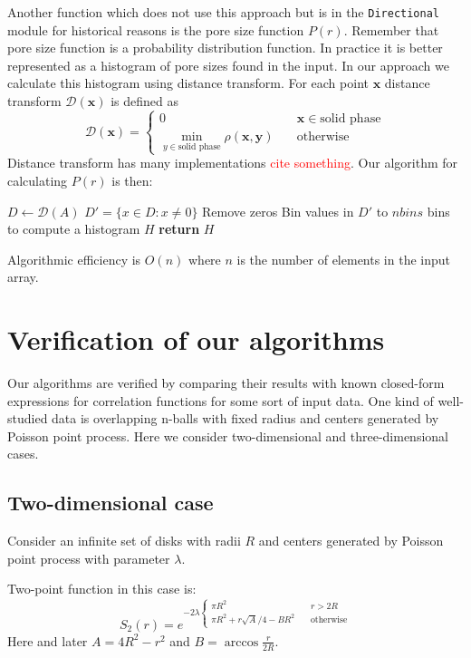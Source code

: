 \documentclass[reprint,amsmath,amssymb,aps,pre,showkeys,showpacs,nofootinbib]{revtex4-1}
\newcommand{\code}[1]{\colorbox{light-gray}{\texttt{#1}}}
\begin{document}
Another function which does not use this approach but is in the
\code{Directional} module for historical reasons is the pore size function
$P(r)$. Remember that pore size function is a probability distribution
function. In practice it is better represented as a histogram of pore sizes
found in the input. In our approach we calculate this histogram using distance
transform. For each point $\bm{x}$ distance transform $\mathcal{D}(\bm{x})$ is
defined as
\begin{equation*}
  \mathcal{D}(\bm{x})= \left\{
  \begin{array}{ll}
    0 & \quad \bm{x} \in \text{solid phase} \\
    \min\limits_{y \in \text{solid phase}} \rho(\bm{x},\bm{y}) & \quad \text{otherwise}
  \end{array}
\right.
\end{equation*}
Distance transform has many implementations \textcolor{red}{cite something}. Our
algorithm for calculating $P(r)$ is then:
\begin{algorithmic}[1]
    \State $D \gets \mathcal{D}(A)$ 
    \State $D' = \{ x \in D: x \ne 0\}$
    \Comment Remove zeros
    \State Bin values in $D'$ to $nbins$ bins to compute a histogram $H$
    \State \textbf{return} $H$
  \EndProcedure
\end{algorithmic}
Algorithmic efficiency is $O(n)$ where $n$ is the number of elements in the
input array.

\section{Verification of our algorithms}
\label{sec:verification}
Our algorithms are verified by comparing their results with known closed-form
expressions for correlation functions for some sort of input data. One kind of
well-studied data is overlapping n-balls with fixed radius and centers generated
by Poisson point process. Here we consider two-dimensional and three-dimensional
cases.

\subsection{Two-dimensional case}
Consider an infinite set of disks with radii $R$ and centers generated by
Poisson point process with parameter $\lambda$.

Two-point function in this case is: \cite{Torquato_book}
\begin{equation*}
  S_2(r) = e^{-2\lambda \left\{
  \begin{array}{ll}
    \pi R^2 & \quad r > 2R \\
    \pi R^2 + r\sqrt{A}/4 - BR^2 & \quad \text{otherwise}
  \end{array}
  \right.}
\end{equation*}
Here and later $A = 4R^2 - r^2$ and $B = \arccos \frac{r}{2R}$.
\end{document}
